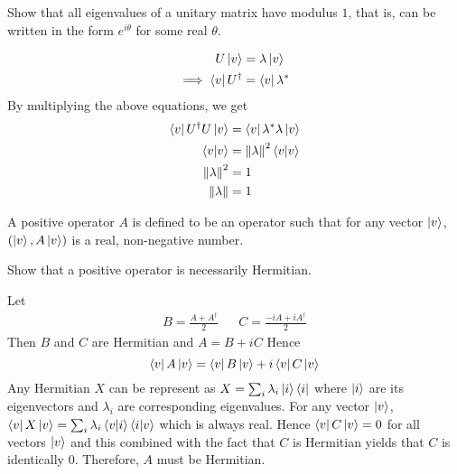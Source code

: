 \begin{exercise}
    Show that all eigenvalues of a unitary matrix have modulus $1$, that is, can be written in the form $e^{i\theta}$ for some real $\theta$.
\end{exercise}
\begin{solution}
    \begin{equation*}
    \begin{split}
        U\ket{v} & = \lambda\ket{v} \\
        \implies \bra{v}U^\dag & = \bra{v}\lambda^\ast
    \end{split}
    \end{equation*}
    By multiplying the above equations, we get
    \begin{equation*}
    \begin{split}
        \bra{v}U^\dag U\ket{v} & = \bra{v}\lambda^\ast\lambda\ket{v} \\
        \braket{v}{v} & = \norm{\lambda}^2\braket{v}{v} \\
        \norm{\lambda}^2 & = 1 \\
        \norm{\lambda} & = 1
    \end{split}
    \end{equation*}
\end{solution}

\begin{definition}
    A positive operator $A$ is defined to be an operator such that for any vector $\ket{v}$, $(\ket{v}, A\ket{v})$ is a real, non-negative number.
\end{definition}

\begin{exercise}
    Show that a positive operator is necessarily Hermitian.
\end{exercise}
\begin{solution}
    Let
    \begin{align*}
        B = \frac{A+A^\dag}{2} && C = \frac{-iA+iA^\dag}{2}
    \end{align*}
    Then $B$ and $C$ are Hermitian and $A = B + iC$
    Hence
    $$\bra{v}A\ket{v} = \bra{v}B\ket{v} + i\bra{v}C\ket{v}$$
    Any Hermitian $X$ can be represent as $X = \sum_{i}{\lambda_i\ket{i}\bra{i}}$ where $\ket{i}$ are its eigenvectors and $\lambda_i$ are corresponding eigenvalues.
    For any vector $\ket{v}$, $\bra{v}X\ket{v} = \sum_{i}{\lambda_i\braket{v}{i}\braket{i}{v}}$ which is always real.
    Hence $\bra{v}C\ket{v} = 0$ for all vectors $\ket{v}$ and this combined with the fact that $C$ is Hermitian yields that $C$ is identically $0$. Therefore, $A$ must be Hermitian.
\end{solution}

